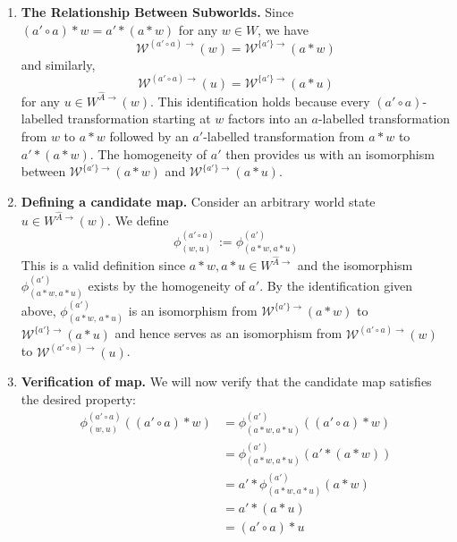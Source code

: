 \begin{proofE}
\begin{enumerate}
    \item \textbf{The Relationship Between Subworlds.}
    Since $(a' \circ a) \ast w = a' \ast (a \ast w)$ for any $w \in W$, we have
    \begin{equation}
        \mathscr{W}^{(a' \circ a)\to}(w) = \mathscr{W}^{\{a'\}\to}(a \ast w)
    \end{equation}
    and similarly,
    \begin{equation}
        \mathscr{W}^{(a' \circ a)\to}(u) = \mathscr{W}^{\{a'\}\to}(a \ast u)
    \end{equation}
    for any $u \in W^{\hat{A}\to}(w)$.
    This identification holds because every $(a' \circ a)$-labelled transformation starting at $w$ factors into an $a$-labelled transformation from $w$ to $a \ast w$ followed by an $a'$-labelled transformation from $a \ast w$ to $a' \ast (a \ast w)$.
    The homogeneity of $a'$ then provides us with an isomorphism between $\mathscr{W}^{\{a'\}\to}(a \ast w)$ and $\mathscr{W}^{\{a'\}\to}(a \ast u)$.

    \item \textbf{Defining a candidate map.}
    Consider an arbitrary world state $u \in W^{\hat{A}\to}(w)$.
    We define
    \begin{equation}
        \phi^{(a' \circ a)}_{(w,u)} := \phi^{(a')}_{(a \ast w, a \ast u)}
    \end{equation}
    This is a valid definition since $a \ast w, a \ast u \in W^{\hat{A}\to}$ and the isomorphism $\phi^{(a')}_{(a \ast w, a \ast u)}$ exists by the homogeneity of $a'$.
    By the identification given above, $\phi^{(a')}_{(a \ast w,\, a \ast u)}$ is an isomorphism from $\mathscr{W}^{\{a'\}\to}(a \ast w)$ to $\mathscr{W}^{\{a'\}\to}(a \ast u)$ and hence serves as an isomorphism from $\mathscr{W}^{(a' \circ a)\to}(w)$ to $\mathscr{W}^{(a' \circ a)\to}(u)$.

    \item \textbf{Verification of map.}
    We will now verify that the candidate map satisfies the desired property:
    \begin{align}
        \phi^{(a' \circ a)}_{(w,u)}((a' \circ a) \ast w) & = \phi_{(a \ast w, a \ast u)}^{(a')}((a' \circ a) \ast w) \\
        & = \phi_{(a \ast w, a \ast u)}^{(a')}(a' \ast (a \ast w)) \\
        & = a' \ast \phi_{(a \ast w, a \ast u)}^{(a')}(a \ast w) \\
        & = a' \ast (a \ast u) \\
        & = (a' \circ a) \ast u
    \end{align}
\end{enumerate}
\end{proofE}

